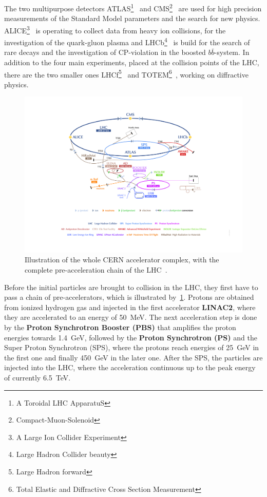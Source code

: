 \noindent The two multipurpose detectors ATLAS\footnote{A Toroidal LHC ApparatuS}~\cite{Aad:2008zzm} and CMS\footnote{Compact-Muon-Solenoid}~\cite{Chatrchyan:2008aa} are used for high precision measurements of the Standard Model parameters and the search for new physics. ALICE\footnote{A Large Ion Collider Experiment}~\cite{Aamodt:2008zz} is operating to collect data from heavy ion collisions, for the investigation of the quark-gluon plasma and LHCb\footnote{Large Hadron Collider beauty}~\cite{Alves:2008zz} is build for the search of rare decays and the investigation of CP-violation in the boosted $b\bar{b}$-system. In addition to the four main experiments, placed at the collision points of the LHC, there are the two smaller ones LHCf\footnote{Large Hadron forward}~\cite{Adriani:2008zz} and TOTEM\footnote{Total Elastic and Diffractive Cross Section Measurement}~\cite{Anelli:2008zza}, working on diffractive physics.\\
\begin{figure}[h]
	\centering
	\includegraphics[width=1.0\linewidth]{Pics/cp3/32}
	\caption{Illustration of the whole CERN accelerator complex, with the complete pre-acceleration chain of the LHC~\cite{DeMelis:2119882}.} 
	\label{fig:32}
\end{figure}

\noindent Before the initial particles are brought to collision in the LHC, they first have to pass a chain of pre-accelerators, which is illustrated by~\cref{fig:32}. Protons  are obtained from ionized hydrogen gas and injected in the first accelerator \textbf{LINAC2}, where they are accelerated to an energy of 50~MeV. The next acceleration step is done by the \textbf{Proton Synchrotron Booster (PBS)} that amplifies the proton energies towards 1.4~GeV, followed by the \textbf{Proton Synchrotron (PS)} and the {Super Proton Synchrotron (SPS)}, where the protons reach energies of 25~GeV in the first one and finally 450~GeV in the later one. After the SPS, the particles are injected into the {LHC}, where the acceleration continuous up to the peak energy of currently 6.5~TeV.\\

